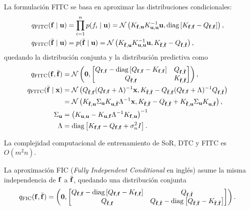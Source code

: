 La formulación FITC se basa en aproximar las distribuciones condicionales:
\begin{align*}
	q_{\mathrm{FITC}}(\mathbf{f} \mid \mathbf{u})		&= \prod_{i=1}^{n} p(f_{i} \mid \mathbf{u}) = \mathcal{N}\left(K_{\mathbf{f}, \mathbf{u}} K_{\mathbf{u},\mathbf{u}}^{-1} \mathbf{u}, \operatorname{diag}\left[K_{\mathbf{f}, \mathbf{f}} - Q_{\mathbf{f}, \mathbf{f}}\right] \right),\\
	q_{\mathrm{FITC}}(\bar{\mathbf{f}} \mid \mathbf{u})	&= p(\bar{\mathbf{f}} \mid \mathbf{u}) = \mathcal{N}\left(K_{\bar{\mathbf{f}}, \mathbf{u}} K_{\mathbf{u}, \mathbf{u}}^{-1} \mathbf{u}, K_{\bar{\mathbf{f}}, \bar{\mathbf{f}}} - Q_{\bar{\mathbf{f}}, \bar{\mathbf{f}}}\right),
\end{align*}
quedando la distribución conjunta y la distribución predictiva como
\begin{align*}
	q_{\mathrm{FITC}}(\mathbf{f}, \bar{\mathbf{f}})	&= \mathcal{N}\left(\mathbf{0}, \begin{bmatrix}
		Q_{\mathbf{f}, \mathbf{f}} - \operatorname{diag}\left[Q_{\mathbf{f}, \mathbf{f}} - K_{\mathbf{f}, \mathbf{f}}\right] & Q_{\mathbf{f}, \bar{\mathbf{f}}} \\
		Q_{\bar{\mathbf{f}}, \mathbf{f}} & K_{\bar{\mathbf{f}}, \bar{\mathbf{f}}}
	\end{bmatrix}
	\right), \\
	q_{\mathrm{FITC}}(\bar{\mathbf{f}} \mid \mathbf{x})	&= \mathcal{N}\left(Q_{\bar{\mathbf{f}}, \mathbf{f}} (Q_{\mathbf{f}, \mathbf{f}} + \Lambda)^{-1} \mathbf{x}, K_{\bar{\mathbf{f}}, \bar{\mathbf{f}}} - Q_{\bar{\mathbf{f}}, \mathbf{f}}(Q_{\mathbf{f}, \mathbf{f}} + \Lambda)^{-1} Q_{\mathbf{f}, \bar{\mathbf{f}}}\right) \\
											&= \mathcal{N} \left(K_{\bar{\mathbf{f}}, \mathbf{u}} \Sigma_{\mathbf{u}} K_{\mathbf{u}, \bar{\mathbf{f}}} \Lambda^{-1} \mathbf{x}, K_{\bar{\mathbf{f}}, \bar{\mathbf{f}}} - Q_{\bar{\mathbf{f}}, \bar{\mathbf{f}}} + K_{\bar{\mathbf{f}}, \mathbf{u}} \Sigma_{\mathbf{u}} K_{\mathbf{u}, \bar{\mathbf{f}}}\right), \\
	\Sigma_{\mathbf{u}}							&= \left(K_{\mathbf{u}, \mathbf{u}} - K_{\mathbf{u}, \mathbf{f}} \Lambda^{-1} K_{\mathbf{f}, \mathbf{u}}\right)^{-1} \\
	\Lambda 								&= \operatorname{diag}\left[K_{\mathbf{f}, \mathbf{f}} - Q_{\mathbf{f}, \mathbf{f}} + \sigma_n^2 I\right].
\end{align*}

\begin{proposition}
	La complejidad computacional de entrenamiento de SoR, DTC y FITC es \(O(m^{2} n)\).
\end{proposition}

\begin{definition}
	La aproximación FIC (\emph{Fully Independent Conditional} en inglés) asume la misma independencia de \(\mathbf{f}\) a \(\bar{\mathbf{f}}\), quedando una distribución conjunta
	\begin{equation*}
		q_{\mathrm{FIC}}(\mathbf{f}, \bar{\mathbf{f}}) = \left(\mathbf{0}, \begin{bmatrix}
			Q_{\mathbf{f}, \mathbf{f}} - \operatorname{diag}\left[Q_{\mathbf{f}, \mathbf{f}} - K_{\mathbf{f}, \mathbf{f}}\right] & Q_{\mathbf{f}, \bar{\mathbf{f}}} \\
			Q_{\bar{\mathbf{f}}, \mathbf{f}} & Q_{\bar{\mathbf{f}}, \bar{\mathbf{f}}} - \operatorname{diag}\left[Q_{\bar{\mathbf{f}}, \bar{\mathbf{f}}} - K_{\bar{\mathbf{f}}, \bar{\mathbf{f}}}\right]
		\end{bmatrix}
	\right).
	\end{equation*}
\end{definition}

